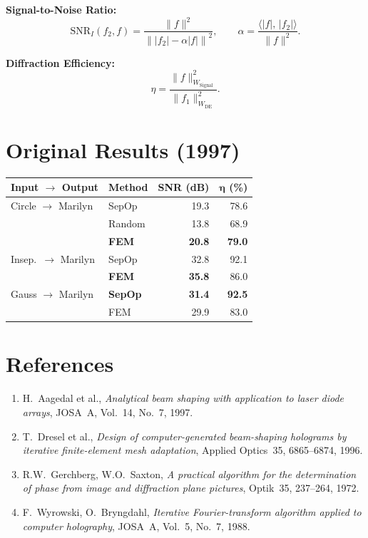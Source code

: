 \documentclass[11pt,a4paper]{article}
\begin{document}
\textbf{Signal-to-Noise Ratio:}
\[
  \mathrm{SNR}_I(f_2,f) = \frac{\|f\|^2}{\left\| |f_2| - \alpha|f| \right\|^2},
  \qquad \alpha = \frac{\langle |f|,\, |f_2|\rangle}{\|f\|^2}.
\]

\textbf{Diffraction Efficiency:}
\[
  \eta = \frac{\|f\|^2_{W_{\mathrm{Signal}}}}{\|f_1\|^2_{W_{\mathrm{DE}}}}.
\]

\section{Original Results (1997)}

\begin{center}
\begin{tabular}{|l|l|r|r|}
\hline
\textbf{Input $\to$ Output} & \textbf{Method} & \textbf{SNR (dB)} & $\boldsymbol{\eta}$ \textbf{(\%)} \\ \hline\hline
Circle $\to$ Marilyn & SepOp  & 19.3 & 78.6 \\
                     & Random & 13.8 & 68.9 \\
                     & \textbf{FEM} & \textbf{20.8} & \textbf{79.0} \\ \hline
Insep.\ $\to$ Marilyn & SepOp  & 32.8 & 92.1 \\
                       & \textbf{FEM} & \textbf{35.8} & 86.0 \\ \hline
Gauss $\to$ Marilyn & \textbf{SepOp} & \textbf{31.4} & \textbf{92.5} \\
                    & FEM   & 29.9 & 83.0 \\ \hline
\end{tabular}
\end{center}

\section{References}

\begin{enumerate}
\item H.~Aagedal et al., \emph{Analytical beam shaping with application to laser 
  diode arrays}, JOSA~A, Vol.~14, No.~7, 1997.
\item T.~Dresel et al., \emph{Design of computer-generated beam-shaping holograms 
  by iterative finite-element mesh adaptation}, Applied Optics~35, 6865--6874, 1996.
\item R.W.~Gerchberg, W.O.~Saxton, \emph{A practical algorithm for the determination 
  of phase from image and diffraction plane pictures}, Optik~35, 237--264, 1972.
\item F.~Wyrowski, O.~Bryngdahl, \emph{Iterative Fourier-transform algorithm applied 
  to computer holography}, JOSA~A, Vol.~5, No.~7, 1988.
\end{enumerate}
\end{document}
